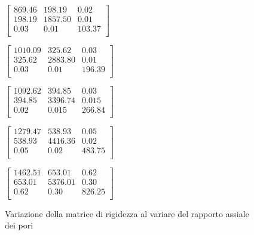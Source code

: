 \documentclass[a4paper,num-refs]{oup-contemporary}
\begin{document}
\begin{figure}
	\begin{minipage}[b]{0.19\linewidth}
		\footnotesize{$
			\begin{bmatrix}
				869.46 & 198.19 & 0.02 \\
				198.19 & 1857.50 & 0.01 \\
				0.03 & 0.01& 103.37 \\
			\end{bmatrix}
			$}
	\end{minipage}
	\begin{minipage}[b]{0.19\linewidth}
		\footnotesize{$
			\begin{bmatrix}
				1010.09 & 325.62 & 0.03 \\
				325.62 & 2883.80 & 0.01\\
				0.03 & 0.01 & 196.39 \\
			\end{bmatrix}
			$}
	\end{minipage}
	\begin{minipage}[b]{0.19\linewidth}
		\footnotesize{$
			\begin{bmatrix}
				1092.62 & 394.85 & 0.03\\
				394.85 & 3396.74 & 0.015 \\
				0.02 & 0.015 & 266.84 \\
			\end{bmatrix}
			$}
	\end{minipage}
	\begin{minipage}[b]{0.19\linewidth}
		\footnotesize{$
			\begin{bmatrix}
				1279.47 & 538.93 & 0.05 \\
				538.93 & 4416.36 & 0.02 \\
				0.05 & 0.02 & 483.75 \\
			\end{bmatrix}
			$}
	\end{minipage}
	\begin{minipage}[b]{0.19\linewidth}
		\footnotesize{$
			\begin{bmatrix}
				1462.51 & 653.01 & 0.62 \\
				653.01 & 5376.01 & 0.30 \\
				0.62 & 0.30 & 826.25 \\
			\end{bmatrix}
			$}
	\end{minipage} 
	
	\caption{Variazione della matrice di rigidezza al variare del rapporto assiale dei pori}
	\label{fig:geometry_variation} 
\end{figure}
\end{document}
